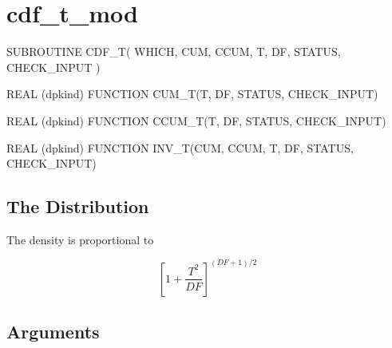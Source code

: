 \documentclass[12pt,dvips]{article}
\newcommand{\mysection}[1]{\color{blue}
             \section{#1} \normalcolor}
\newcommand{\mysubsection}[1] {\color{green}
             \subsection{#1} \normalcolor}
\begin{document}
\pagebreak

\mysection{cdf\_t\_mod}

\begin{description}

\item SUBROUTINE CDF\_T( WHICH, CUM, CCUM, T, DF,
                        STATUS, CHECK\_INPUT )

\item REAL (dpkind) FUNCTION CUM\_T(T, DF, STATUS, CHECK\_INPUT)

\item REAL (dpkind)  FUNCTION CCUM\_T(T, DF, STATUS, CHECK\_INPUT)

\item REAL (dpkind)  FUNCTION INV\_T(CUM, CCUM, T, DF, STATUS,
CHECK\_INPUT)

\end{description}

\mysubsection{The Distribution}

The density is proportional to

\[ \left[ 1 + \frac{T^2}{DF} \right]^{(DF+1)/2} \]

\mysubsection{Arguments}
\end{document}
